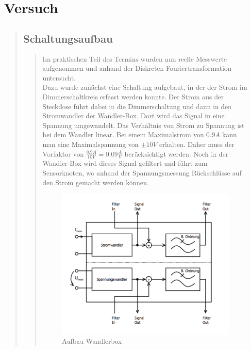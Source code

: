 \section{Versuch}
\begin{quote}

	\subsection{Schaltungsaufbau}
	\begin{quote}
	Im praktischen Teil des Termins wurden nun reelle Messwerte aufgenommen und
	anhand der Diskreten Fouriertransformation untersucht.\\
	Dazu wurde zunächst eine Schaltung aufgebaut, in der der Strom im
	Dimmerschaltkreis erfasst werden konnte. Der Strom aus der Steckdose führt
	dabei in die Dimmerschaltung und dann in den Stromwandler der Wandler-Box. Dort
	wird das Signal in eine Spannung umgewandelt. Das Verhältnis von Strom zu
	Spannung ist bei dem Wandler linear. Bei einem Maximalstrom von $0.9 A$ kann
	man eine Maximalspannung von $\pm 10 V$ erhalten. Daher muss der Vorfaktor von
	$\frac{0.9 A}{10 V} = 0.09 \frac{A}{V}$ berücksichtigt werden. Noch in der
	Wandler-Box wird dieses Signal gefiltert und führt zum Sensorknoten, wo anhand
	der Spannungsmessung Rückschlüsse auf den Strom gemacht werden können.
	
	\begin{figure}[H]
    \centering
        \includegraphics[scale=0.7, trim = 0cm 0cm 0cm 0cm, clip]{./Bilder/Schaltungwandlerbox}
            \caption{Aufbau Wandlerbox}
    \end{figure}
    

\end{quote}
\end{quote}
